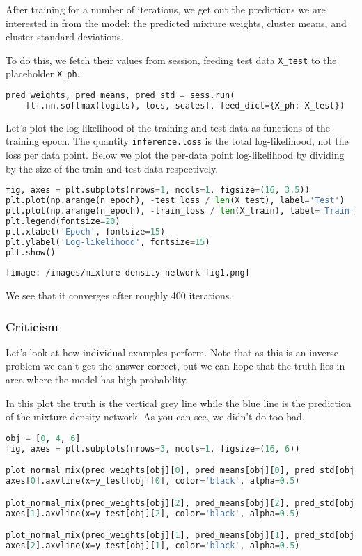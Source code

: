 After training for a number of iterations, we get out the predictions
we are interested in from the model: the predicted mixture weights,
cluster means, and cluster standard deviations.

To do this, we fetch their values from session, feeding test data
\texttt{X_test} to the placeholder \texttt{X_ph}.

\begin{lstlisting}[language=Python]
pred_weights, pred_means, pred_std = sess.run(
    [tf.nn.softmax(logits), locs, scales], feed_dict={X_ph: X_test})
\end{lstlisting}

Let's plot the log-likelihood of the training and test data as
functions of the training epoch. The quantity \texttt{inference.loss}
is the total log-likelihood, not the loss per data point. Below we
plot the per-data point log-likelihood by dividing by the size of the
train and test data respectively.

\begin{lstlisting}[language=Python]
fig, axes = plt.subplots(nrows=1, ncols=1, figsize=(16, 3.5))
plt.plot(np.arange(n_epoch), -test_loss / len(X_test), label='Test')
plt.plot(np.arange(n_epoch), -train_loss / len(X_train), label='Train')
plt.legend(fontsize=20)
plt.xlabel('Epoch', fontsize=15)
plt.ylabel('Log-likelihood', fontsize=15)
plt.show()
\end{lstlisting}

\texttt{[image: /images/mixture-density-network-fig1.png]}

We see that it converges after roughly 400 iterations.

\subsubsection{Criticism}

Let's look at how individual examples perform. Note that as this is an
inverse problem we can't get the answer correct, but we can hope that
the truth lies in area where the model has high probability.

In this plot the truth is the vertical grey line while the blue line
is the prediction of the mixture density network. As you can see, we
didn't do too bad.

\begin{lstlisting}[language=Python]
obj = [0, 4, 6]
fig, axes = plt.subplots(nrows=3, ncols=1, figsize=(16, 6))

plot_normal_mix(pred_weights[obj][0], pred_means[obj][0], pred_std[obj][0], axes[0], comp=False)
axes[0].axvline(x=y_test[obj][0], color='black', alpha=0.5)

plot_normal_mix(pred_weights[obj][2], pred_means[obj][2], pred_std[obj][2], axes[1], comp=False)
axes[1].axvline(x=y_test[obj][2], color='black', alpha=0.5)

plot_normal_mix(pred_weights[obj][1], pred_means[obj][1], pred_std[obj][1], axes[2], comp=False)
axes[2].axvline(x=y_test[obj][1], color='black', alpha=0.5)
\end{lstlisting}

